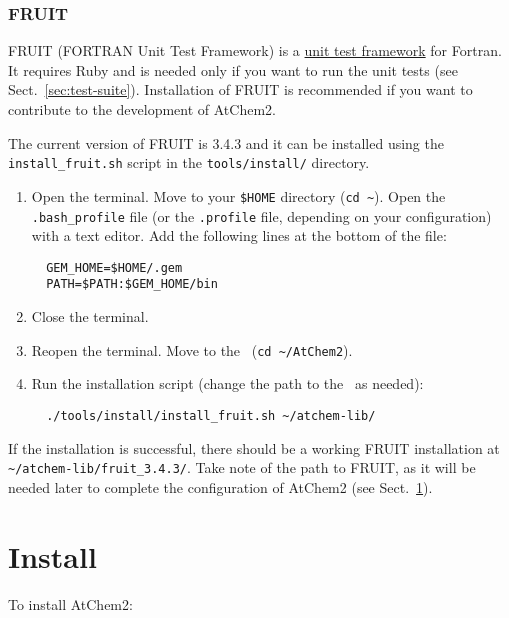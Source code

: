 \subsubsection{FRUIT}

FRUIT (FORTRAN Unit Test Framework) is a
\href{https://en.wikipedia.org/wiki/Unit_testing}{unit test framework}
for Fortran. It requires Ruby and is needed only if you want to run
the unit tests (see Sect.~\ref{sec:test-suite}). Installation of FRUIT
is recommended if you want to contribute to the development of
AtChem2.

The current version of FRUIT is 3.4.3 and it can be installed using the
\texttt{install\_fruit.sh} script in the \texttt{tools/install/}
directory.

\begin{enumerate}
\item Open the terminal. Move to your \texttt{\$HOME} directory
  (\texttt{cd\ \textasciitilde}). Open the \texttt{.bash\_profile}
  file (or the \texttt{.profile} file, depending on your
  configuration) with a text editor. Add the following lines at the
  bottom of the file:
  \begin{verbatim}
  GEM_HOME=$HOME/.gem
  PATH=$PATH:$GEM_HOME/bin
  \end{verbatim}
\item Close the terminal.
\item Reopen the terminal. Move to the \maindir\ (\verb|cd ~/AtChem2|).
\item Run the installation script (change the path to the \depdir\ as
  needed):
  \begin{verbatim}
  ./tools/install/install_fruit.sh ~/atchem-lib/
  \end{verbatim}
\end{enumerate}

If the installation is successful, there should be a working FRUIT
installation at \texttt{\textasciitilde/atchem-lib/fruit\_3.4.3/}.
Take note of the path to FRUIT, as it will be needed later to complete
the configuration of AtChem2 (see Sect.~\ref{sec:install}).


\section{Install} \label{sec:install}

To install AtChem2:

